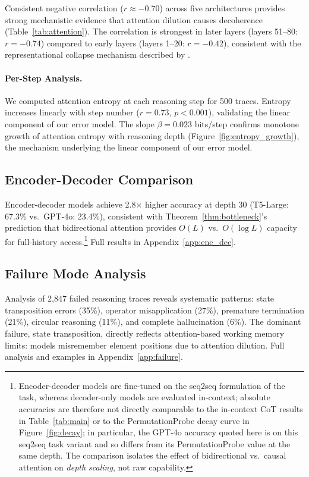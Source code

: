 \documentclass{article}
\theoremstyle{plain}
\theoremstyle{definition}
\theoremstyle{remark}
\begin{document}
Consistent negative correlation ($r \approx -0.70$) across five architectures provides strong mechanistic evidence that attention dilution causes decoherence (Table~\ref{tab:attention}). The correlation is strongest in later layers (layers 51--80: $r = -0.74$) compared to early layers (layers 1--20: $r = -0.42$), consistent with the representational collapse mechanism described by \citet{gerasimov2025fullyutilizetransformersrepresentation}.

\paragraph{Per-Step Analysis.} We computed attention entropy at each reasoning step for 500 traces. Entropy increases linearly with step number ($r = 0.73$, $p < 0.001$), validating the linear component of our error model. The slope $\beta = 0.023$ bits/step confirms monotone growth of attention entropy with reasoning depth (Figure~\ref{fig:entropy_growth}), the mechanism underlying the linear component of our error model.

\subsection{Encoder-Decoder Comparison}

Encoder-decoder models achieve 2.8$\times$ higher accuracy at depth 30 (T5-Large: 67.3\% vs.\ GPT-4o: 23.4\%), consistent with Theorem~\ref{thm:bottleneck}'s prediction that bidirectional attention provides $O(L)$ vs.\ $O(\log L)$ capacity for full-history access.\footnote{Encoder-decoder models are fine-tuned on the seq2seq formulation of the task, whereas decoder-only models are evaluated in-context; absolute accuracies are therefore not directly comparable to the in-context CoT results in Table~\ref{tab:main} or to the PermutationProbe decay curve in Figure~\ref{fig:decay}; in particular, the GPT-4o accuracy quoted here is on this seq2seq task variant and so differs from its PermutationProbe value at the same depth. The comparison isolates the effect of bidirectional vs.\ causal attention on \emph{depth scaling}, not raw capability.} Full results in Appendix~\ref{app:enc_dec}.

\subsection{Failure Mode Analysis}

Analysis of 2,847 failed reasoning traces reveals systematic patterns: state transposition errors (35\%), operator misapplication (27\%), premature termination (21\%), circular reasoning (11\%), and complete hallucination (6\%). The dominant failure, state transposition, directly reflects attention-based working memory limits: models misremember element positions due to attention dilution. Full analysis and examples in Appendix~\ref{app:failure}.
\end{document}
